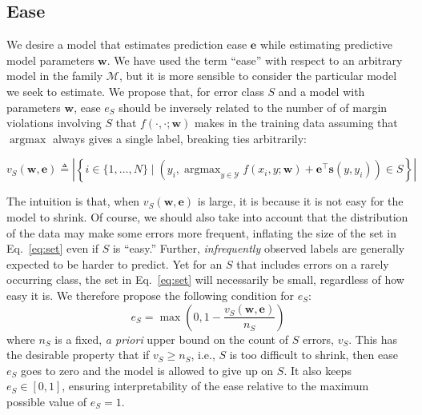 \documentclass{article} %
\DeclareMathOperator*{\argmax}{argmax}
\begin{document}
\subsection{Ease}
\label{sec:ease}
We desire a model that estimates prediction ease $\mathbf{e}$ while
estimating
predictive model parameters $\mathbf{w}$. 
We have used the term ``ease''
with respect to an arbitrary model in the family $\mathcal{M}$, but it
is more sensible to consider the particular model we seek to
estimate.  We propose that, for error class $S$ and a model with
parameters $\mathbf{w}$, ease $e_S$ should be inversely related to the
number of
of margin violations involving $S$ that $f(\cdot, \cdot; \mathbf{w})$ makes in the
training data assuming that $\argmax$ always gives a 
single label, breaking ties arbitrarily:

\begin{equation}
v_S (\mathbf{w}, \mathbf{e}) \triangleq \left|\left\{ i  \in \{1,\ldots, N\} \mid \left(y_i, \textstyle \argmax_{y \in \mathcal{Y}} f(x_i, y ; \mathbf{w}) +
\mathbf{e}^\top \mathbf{s}(y, y_i)\right) \in S\right\}\right| \label{eq:set}
\end{equation}

The intuition is that, when $v_S(\mathbf{w},\mathbf{e})$ 
is large, it is because it is not easy for the
model to shrink.  Of course, we should also take into account 
that the distribution of the data may make some errors more frequent,
inflating the size of the set in Eq.~\ref{eq:set} even if $S$ is ``easy.''
Further,  \emph{infrequently} observed labels are generally
expected to be harder to predict.  Yet for an $S$ that includes errors on
a  rarely occurring class, the set in Eq.~\ref{eq:set} will
necessarily be small, regardless of how easy it is.
We therefore propose the following condition for $e_S$:
\begin{equation}
e_S = \max\left( 0, 1 - \frac{v_S(\mathbf{w}, \mathbf{e}) }{n_S}\right) \label{e-condition}
\end{equation}
where $n_S$ is a fixed, \emph{a priori} upper bound on the count of
$S$ errors, $v_S$.   This
has the desirable property that  if $v_S \ge n_S$,  i.e., $S$ is too
difficult to shrink, then ease $e_S$ goes to zero and the model is
allowed to give up on $S$.  It also keeps $e_S \in [0,1]$, 
ensuring interpretability of the ease relative to the
maximum possible value of $e_S=1$.
\end{document}
